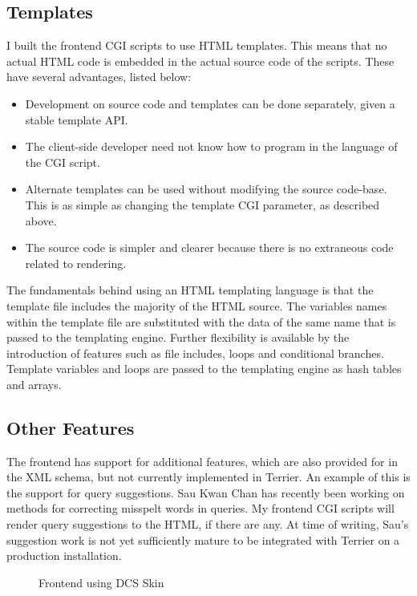 \subsection{Templates}
I built the frontend CGI scripts to use HTML templates. This means that no actual HTML code is embedded in the actual source code of the scripts. These have several advantages, listed below:
\begin{itemize}
\item{Development on source code and templates can be done separately, given a stable template API.}
\item{The client-side developer need not know how to program in the language of the CGI script.}
\item{Alternate templates can be used without modifying the source code-base. This is as simple as changing the template CGI parameter, as described above.}
\item{The source code is simpler and clearer because there is no extraneous code related to rendering.}
\end{itemize}
The fundamentals behind using an HTML templating language is that the template file includes the majority of the HTML source. The variables names within the template file are substituted with the data of the same name that is passed to the templating engine. Further flexibility is available by the introduction of features such as file includes, loops and conditional branches. Template variables and loops are passed to the templating engine as hash tables and arrays.

\subsection{Other Features}
The frontend has support for additional features, which are also provided for in the XML schema, but not currently implemented in Terrier. An example of this is the support for query suggestions. Sau Kwan Chan has recently been working on methods for correcting misspelt words in queries. My frontend CGI scripts will render query suggestions to the HTML, if there are any. At time of writing, Sau's suggestion work is not yet sufficiently mature to be integrated with Terrier on a production installation.
\begin{figure}[h]
  \centerline{
   }
\label{fig-frontend}
\caption{Frontend using DCS Skin}
\end{figure}
